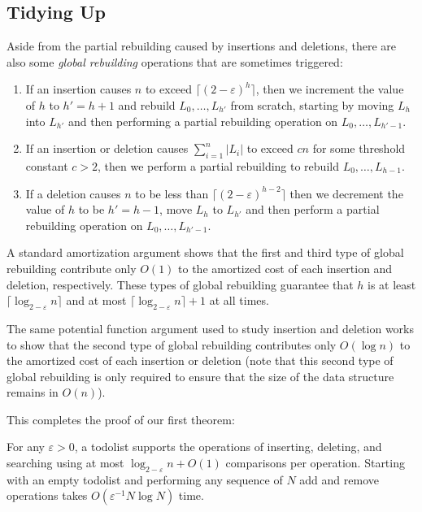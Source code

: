 \documentclass{patmorin}
\newcommand{\eps}{\varepsilon}
\begin{document}
\subsection{Tidying Up}

Aside from the partial rebuilding caused by insertions and deletions,
there are also some \emph{global rebuilding} operations that are sometimes
triggered:
\begin{enumerate}
\item If an insertion causes $n$ to exceed $\lceil(2-\eps)^h\rceil$, then
we increment the value of $h$ to $h'=h+1$ and rebuild $L_0,\ldots,L_{h'}$
from scratch, starting by moving $L_h$ into $L_{h'}$ and then performing
a partial rebuilding operation on $L_{0},\ldots,L_{h'-1}$.
\item If an insertion or deletion causes $\sum_{i=1}^n |L_i|$ to exceed $cn$ for some threshold constant $c>2$, then we perform a partial rebuilding to rebuild $L_{0},\ldots,L_{h-1}$.
\item If a deletion causes $n$ to be less than $\lceil(2-\eps)^{h-2}\rceil$ then we decrement the value of $h$ to be $h'=h-1$, move $L_h$ to $L_{h'}$ and then perform a partial rebuilding operation on $L_{0},\ldots,L_{h'-1}$. 
\end{enumerate}

A standard amortization argument shows that the first and third type
of global rebuilding contribute only $O(1)$ to the amortized cost of
each insertion and deletion, respectively.  
These types of global rebuilding guarantee that $h$ is at least $\lceil \log_{2-\varepsilon} n\rceil$ and
at most $\lceil \log_{2-\varepsilon} n\rceil+1$ at all times.

The same potential function
argument used to study insertion and deletion works to show that the
second type of global rebuilding contributes only $O(\log n)$ to the
amortized cost of each insertion or deletion (note that this second
type of global rebuilding is only required to ensure that the size of
the data structure remains in $O(n)$).

This completes the proof of our first theorem:
\begin{thm}
For any $\eps >0$, a todolist supports the operations of inserting,
deleting, and searching using at most $\log_{2-\eps} n + O(1)$ comparisons
per operation.  Starting with an empty todolist and performing any
sequence of $N$ add and remove operations takes $O(\eps^{-1}N\log
N)$ time.
\end{thm}
\end{document}
